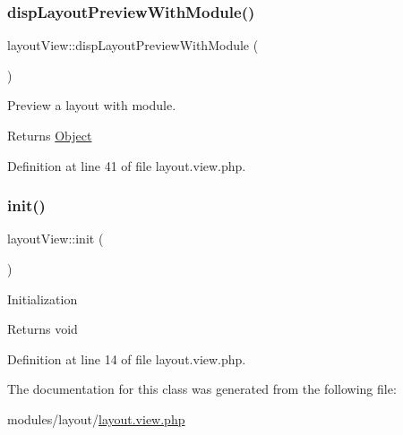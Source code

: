 \subsubsection{\texorpdfstring{disp\+Layout\+Preview\+With\+Module()}{dispLayoutPreviewWithModule()}}
{\footnotesize\ttfamily layout\+View\+::disp\+Layout\+Preview\+With\+Module (\begin{DoxyParamCaption}{ }\end{DoxyParamCaption})}

Preview a layout with module.

\begin{DoxyReturn}{Returns}
\hyperlink{classObject}{Object} 
\end{DoxyReturn}


Definition at line 41 of file layout.\+view.\+php.

\mbox{\label{classlayoutView_ad61f59b8dd10b1b97ebfdcf7d9c230da}} 
\subsubsection{\texorpdfstring{init()}{init()}}
{\footnotesize\ttfamily layout\+View\+::init (\begin{DoxyParamCaption}{ }\end{DoxyParamCaption})}

Initialization \begin{DoxyReturn}{Returns}
void 
\end{DoxyReturn}


Definition at line 14 of file layout.\+view.\+php.



The documentation for this class was generated from the following file\+:\begin{DoxyCompactItemize}
\item 
modules/layout/\hyperlink{layout_8view_8php}{layout.\+view.\+php}\end{DoxyCompactItemize}
